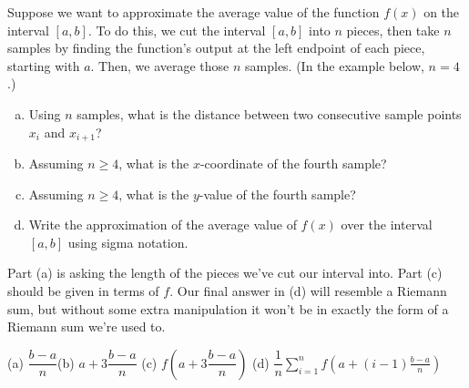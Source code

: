 \begin{question}
Suppose we want to approximate the average value of the function $f(x)$ on the interval $[a,b]$. To do this, we cut the interval $[a,b]$ into $n$ pieces, then take $n$ samples by finding the function's output at the left endpoint of each piece, starting with $a$. Then, we average those $n$ samples. (In the example below, $n=4$.)
\begin{center}
\end{center}
\begin{enumerate}[(a)]
\item Using $n$ samples, what is the distance between two consecutive sample points $x_i$ and $x_{i+1}$?
\item Assuming $n \geq 4$, what is the $x$-coordinate of the fourth sample?
\item Assuming $n \geq 4$, what is the $y$-value of the fourth sample?
\item Write the approximation of the average value of $f(x)$ over the interval $[a,b]$ using sigma notation.
\end{enumerate}
\end{question}
\begin{hint}
Part (a) is asking the length of the pieces we've cut our interval into. Part (c) should be given in terms of $f$.
 Our final answer in (d) will resemble a Riemann sum, but without some extra manipulation it won't be in exactly the form of a Riemann sum we're used to.
\end{hint}
\begin{answer}
(a) $\dfrac{b-a}{n}$\qquad (b) $a+3\dfrac{b-a}{n} $ \qquad
(c) $f\left(a+3\dfrac{b-a}{n} \right)$ \qquad (d)
$\dfrac{1}{n}\sum\limits_{i=1}^n f\left(a+(i-1)\frac{b-a}{n}\right)$
\end{answer}
